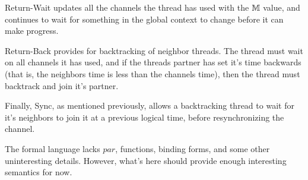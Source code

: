 \documentclass[9pt]{article}
\begin{document}
  Return-Wait updates all the channels the thread has used with the
  $\mathbb{M}$ value, and continues to wait for something in the global
  context to change before it can make progress.

  Return-Back provides for backtracking of neighbor threads. The thread
  must wait on all channels it has used, and if the threads partner has set
  it's time backwards (that is, the neighbors time is less than the
  channels time), then the thread must backtrack and join it's partner.

  Finally, Sync, as mentioned previously, allows a backtracking thread
  to wait for it's neighbors to join it at a previous logical time,
  before resynchronizing the channel.


  The formal language lacks $par$, functions, binding forms, and some
  other uninteresting details. However, what's here should provide
  enough interesting semantics for now.
\end{document}

